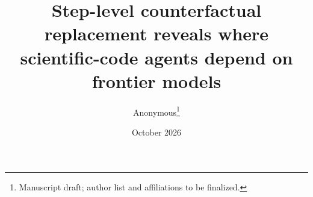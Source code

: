 \documentclass[11pt]{article}
\title{Step-level counterfactual replacement reveals where scientific-code agents depend on frontier models}
\author{Anonymous\thanks{Manuscript draft; author list and affiliations to be finalized.}}
\date{October 2026}
\begin{document}
\maketitle
\begin{abstract}

\end{abstract}



\FloatBarrier



\end{document}

